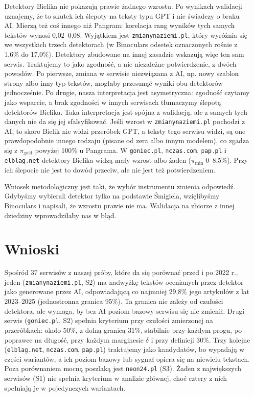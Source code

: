 \documentclass[11pt,a4paper]{article}
\newcommand{\pimin}{\ensuremath{\pi_{\mathrm{min}}}}
\newcommand{\pigold}{\ensuremath{\pi_{\mathrm{gold}}}}
\newcommand{\dom}[1]{\texttt{#1}}
\begin{document}
Detektory Bielika nie pokazują prawie żadnego wzrostu. Po wynikach walidacji uznajemy, że to skutek ich ślepoty na teksty typu GPT i nie świadczy o braku AI. Mierzą też coś innego niż Pangram: korelacja rang wyników tych samych tekstów wynosi 0,02--0,08. Wyjątkiem jest \dom{zmianynaziemi.pl}, który wyróżnia się we wszystkich trzech detektorach (w Binoculars odsetek oznaczonych rośnie z 1,6\% do 17,0\%). Detektory zbudowane na innej zasadzie wskazują więc ten sam serwis. Traktujemy to jako zgodność, a nie niezależne potwierdzenie, z dwóch powodów. Po pierwsze, zmiana w serwisie niezwiązana z AI, np. nowy szablon strony albo inny typ tekstów, mogłaby przesunąć wyniki obu detektorów jednocześnie. Po drugie, nasza interpretacja jest asymetryczna: zgodność czytamy jako wsparcie, a brak zgodności w innych serwisach tłumaczymy ślepotą detektorów Bielika. Taka interpretacja jest spójna z walidacją, ale z samych tych danych nie da się jej sfalsyfikować. Jeśli wzrost w \dom{zmianynaziemi.pl} pochodzi z AI, to skoro Bielik nie widzi przeróbek GPT, a teksty tego serwisu widzi, są one prawdopodobnie innego rodzaju (pisane od zera albo innym modelem), co zgadza się z \pigold{} powyżej 100\% u Pangrama. W \dom{goniec.pl}, \dom{nczas.com}, \dom{pap.pl} i \dom{elblag.net} detektory Bielika widzą mały wzrost albo żaden (\pimin{} 0--8,5\%). Przy ich ślepocie nie jest to dowód przeciw, ale nie jest też potwierdzeniem.

Wniosek metodologiczny jest taki, że wybór instrumentu zmienia odpowiedź. Gdybyśmy wybierali detektor tylko na podstawie Śmigiela, wzięlibyśmy Binoculars i napisali, że wzrostu prawie nie ma. Walidacja na zbiorze z innej dziedziny wprowadziłaby nas w błąd.

\section{Wnioski}\label{sec:wnioski}

Spośród 37 serwisów z naszej próby, które da się porównać przed i po 2022 r., jeden (\dom{zmianynaziemi.pl}, S2) ma nadwyżkę tekstów ocenianych przez detektor jako generowane przez AI, odpowiadającą co najmniej 29,8\% jego artykułów z lat 2023--2025 (jednostronna granica 95\%). Ta granica nie zależy od czułości detektora, ale wymaga, by bez AI poziom bazowy serwisu się nie zmienił. Drugi serwis (\dom{goniec.pl}, S2) spełnia kryterium przy czułości zmierzonej na przeróbkach: około 50\%, z dolną granicą 31\%, stabilnie przy każdym progu, po poprawce na długość, przy każdym marginesie $\delta$ i przy definicji 30\%. Trzy kolejne (\dom{elblag.net}, \dom{nczas.com}, \dom{pap.pl}) traktujemy jako kandydatów, bo wypadają w części wariantów, a ich poziom bazowy lub sygnał opiera się na niewielu tekstach. Poza porównaniem mocną poszlaką jest \dom{neon24.pl} (S3). Żaden z największych serwisów (S1) nie spełnia kryterium w analizie głównej, choć cztery z nich spełniają je w pojedynczych wariantach.
\end{document}
